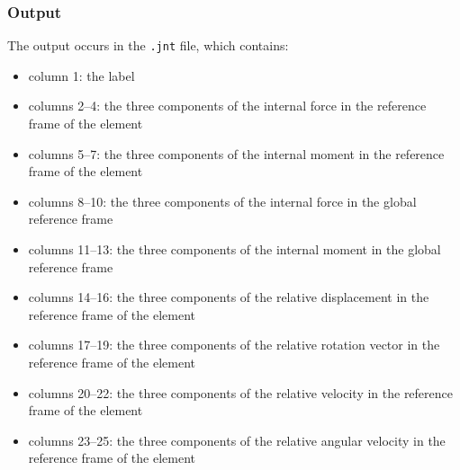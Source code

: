 \subsubsection{Output}
The output occurs in the \texttt{.jnt} file, which contains:
\begin{itemize}
\item column 1: the label

\item columns 2--4: the three components of the internal force in the reference frame of the element

\item columns 5--7: the three components of the internal moment in the reference frame of the element

\item columns 8--10: the three components of the internal force in the global reference frame

\item columns 11--13: the three components of the internal moment in the global reference frame

\item columns 14--16: the three components of the relative displacement in the reference frame of the element

\item columns 17--19: the three components of the relative rotation vector in the reference frame of the element

\item columns 20--22: the three components of the relative velocity in the reference frame of the element

\item columns 23--25: the three components of the relative angular velocity in the reference frame of the element

\end{itemize}

